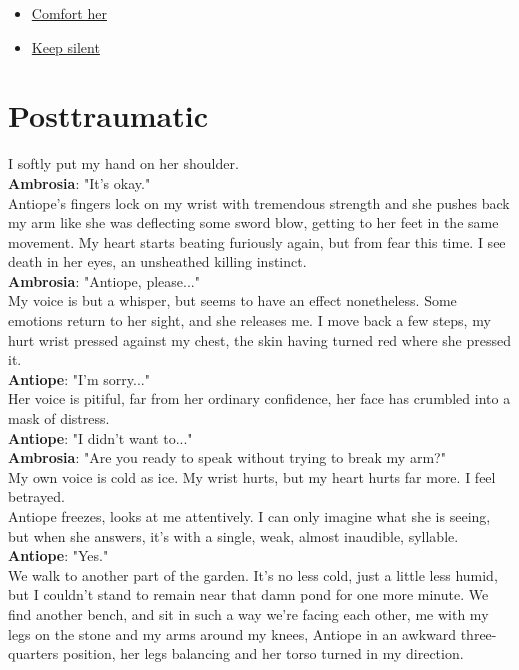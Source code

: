 \documentclass{report}
\newcommand{\speaker}[1]{
	\textbf{#1}: 
}
\newcommand{\glink}[2]{
	\hyperref[#1]{#2}
}
\newcommand{\gsection}[1]{
	\section*{#1}
	\label{#1}
}
\begin{document}
\begin{itemize}
	\item \glink{Posttraumatic}{Comfort her}
	\item \glink{Fleeing the past}{Keep silent}
\end{itemize}

\gsection{Posttraumatic}

I softly put my hand on her shoulder.\\

\speaker{Ambrosia} "It's okay."\\

Antiope's fingers lock on my wrist with tremendous strength and she pushes back my arm like she was deflecting some sword blow, getting to her feet in the same movement. My heart starts beating furiously again, but from fear this time. I see death in her eyes, an unsheathed killing instinct.\\

\speaker{Ambrosia} "Antiope, please..."\\

My voice is but a whisper, but seems to have an effect nonetheless. Some emotions return to her sight, and she releases me. I move back a few steps, my hurt wrist pressed against my chest, the skin having turned red where she pressed it.\\

\speaker{Antiope} "I'm sorry..."\\

Her voice is pitiful, far from her ordinary confidence, her face has crumbled into a mask of distress.\\

\speaker{Antiope} "I didn't want to..."\\

\speaker{Ambrosia} "Are you ready to speak without trying to break my arm?"\\

My own voice is cold as ice. My wrist hurts, but my heart hurts far more. I feel betrayed.\\

Antiope freezes, looks at me attentively. I can only imagine what she is seeing, but when she answers, it's with a single, weak, almost inaudible, syllable.\\

\speaker{Antiope} "Yes."\\

We walk to another part of the garden. It's no less cold, just a little less humid, but I couldn't stand to remain near that damn pond for one more minute. We find another bench, and sit in such a way we're facing each other, me with my legs on the stone and my arms around my knees, Antiope in an awkward three-quarters position, her legs balancing and her torso turned in my direction.\\
\end{document}
